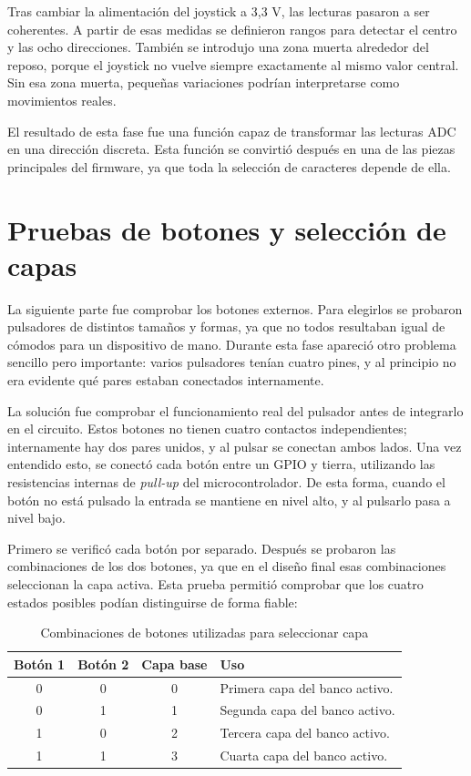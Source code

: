 Tras cambiar la alimentación del joystick a 3,3 V, las lecturas pasaron a ser coherentes. A partir de esas medidas se definieron rangos para detectar el centro y las ocho direcciones. También se introdujo una zona muerta alrededor del reposo, porque el joystick no vuelve siempre exactamente al mismo valor central. Sin esa zona muerta, pequeñas variaciones podrían interpretarse como movimientos reales.

El resultado de esta fase fue una función capaz de transformar las lecturas ADC en una dirección discreta. Esta función se convirtió después en una de las piezas principales del firmware, ya que toda la selección de caracteres depende de ella.

\section{Pruebas de botones y selección de capas}
\label{sec:pruebas-botones-capas}

La siguiente parte fue comprobar los botones externos. Para elegirlos se probaron pulsadores de distintos tamaños y formas, ya que no todos resultaban igual de cómodos para un dispositivo de mano. Durante esta fase apareció otro problema sencillo pero importante: varios pulsadores tenían cuatro pines, y al principio no era evidente qué pares estaban conectados internamente.

La solución fue comprobar el funcionamiento real del pulsador antes de integrarlo en el circuito. Estos botones no tienen cuatro contactos independientes; internamente hay dos pares unidos, y al pulsar se conectan ambos lados. Una vez entendido esto, se conectó cada botón entre un GPIO y tierra, utilizando las resistencias internas de \textit{pull-up} del microcontrolador. De esta forma, cuando el botón no está pulsado la entrada se mantiene en nivel alto, y al pulsarlo pasa a nivel bajo.

Primero se verificó cada botón por separado. Después se probaron las combinaciones de los dos botones, ya que en el diseño final esas combinaciones seleccionan la capa activa. Esta prueba permitió comprobar que los cuatro estados posibles podían distinguirse de forma fiable:

\begin{table}[H]
    \centering
    \caption{Combinaciones de botones utilizadas para seleccionar capa}
    \label{tab:resultado-combinaciones-botones}
    \begin{tabularx}{0.78\textwidth}{@{}cccX@{}}
        \toprule
        \textbf{Botón 1} & \textbf{Botón 2} & \textbf{Capa base} & \textbf{Uso} \\
        \midrule
        0 & 0 & 0 & Primera capa del banco activo. \\
        0 & 1 & 1 & Segunda capa del banco activo. \\
        1 & 0 & 2 & Tercera capa del banco activo. \\
        1 & 1 & 3 & Cuarta capa del banco activo. \\
        \bottomrule
    \end{tabularx}
\end{table}

